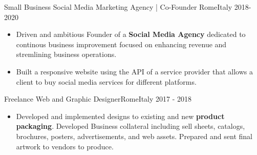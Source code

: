 
\begin{experiences}
  \experience
    {Small Business}   {Social Media Marketing Agency | Co-Founder }{Rome}{Italy}
    {2018- 2020} {
                      \begin{itemize}
                        \item Driven and ambitious Founder of a \textbf{Social Media Agency} dedicated to continous business improvement focused on
                        enhancing revenue and stremlining business operations.

                        \item Built a responsive website using the API of a service provider that allows a client to buy social media services for different platforms.
                      \end{itemize}
                    }
                    {}
  \emptySeparator

  \experience
  {Freelance}   {Web and Graphic Designer}{Rome}{Italy}
  {2017 - 2018} {
                    \begin{itemize}
                      \item Developed and implemented designs to existing and new \textbf{product packaging}. Developed Business collateral including
                      sell sheets, catalogs, brochures, posters, advertisements, and web assets. Prepared and sent final artwork to vendors to
                      produce. 
                    \end{itemize}
                  }
                  {}
\end{experiences}
